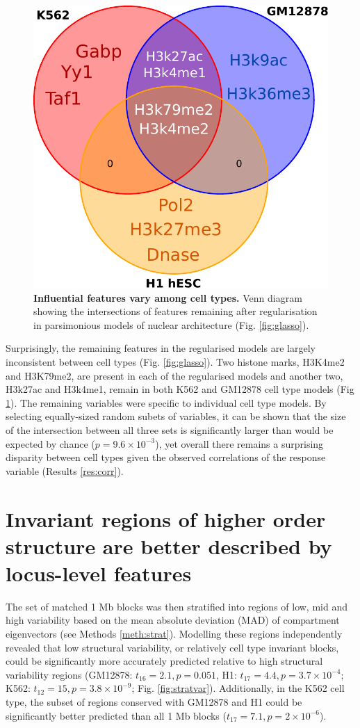 \documentclass[a4paper]{report}
\begin{document}
\begin{figure}
\includegraphics[width=.4\textwidth]{figs/venn.pdf}
\captionsetup{width=.4\textwidth}
\caption{ {\bf Influential features vary among cell types.}
  Venn diagram showing the intersections of features remaining after regularisation in
  parsimonious models of nuclear architecture (Fig. \ref{fig:glasso}).
}\label{fig:venn}
\vspace{-12pt}
\end{figure}

Surprisingly, the remaining features in the regularised 
models are largely inconsistent between cell types
(Fig. \ref{fig:glasso}). Two histone marks, H3K4me2 and H3K79me2, are
present in each of the regularised models and another two, H3k27ac and
H3k4me1, remain in both K562 and GM12878 cell type models (Fig
\ref{fig:venn}). The remaining variables were specific to individual
cell type models. By selecting equally-sized random subets of variables, it can be shown that the size of the intersection
between all three sets is significantly larger than would be expected by
chance ($p = 9.6 \times 10^{-3}$), yet overall there remains a
surprising disparity between cell types given the observed
correlations of the response variable (Results \ref{res:corr}). \\

\section{ Invariant regions of higher order structure are better described by locus-level
    features}
The set of matched 1 Mb blocks was then stratified
into regions of low, mid and high variability based on the mean
absolute deviation (MAD) of compartment eigenvectors (see Methods
\ref{meth:strat}). Modelling these regions independently revealed that
low structural variability, or relatively cell type invariant blocks, could be
significantly more accurately predicted relative to high structural variability
regions (GM12878: $t_{16} = 2.1, p = 0.051$, H1: $t_{17}=4.4, p = 3.7 \times 10^{-4}$; K562: $t_{12} = 15, p
  = 3.8 \times 10^{-9}$; Fig. \ref{fig:stratvar}). Additionally, in
  the K562 cell type, the subset of regions conserved with GM12878 and H1 could
  be significantly better predicted than all 1 Mb blocks ($t_{17} =
  7.1, p = 2 \times 10^{-6}$). \\
\end{document}
